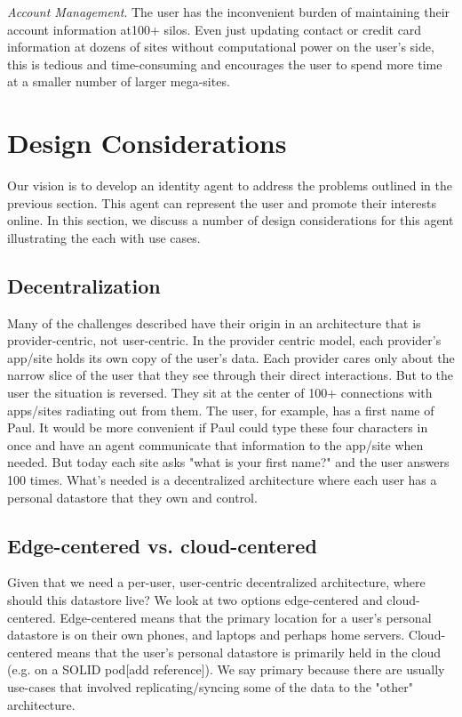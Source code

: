 \documentclass[11pt, oneside]{article}   	%
\begin{document}
\emph{Account Management}. The user has the inconvenient burden of maintaining their account information at100+ silos. Even just updating contact or credit card information at dozens of sites without computational power on the user's side, this is tedious and time-consuming and encourages the user to spend more time at a smaller number of larger mega-sites.

\section{Design Considerations}
Our vision is to develop an identity agent to address the problems outlined in the previous section. This agent  can represent the user and promote their interests online. In this section, we discuss a number of design considerations for this agent illustrating the each with use cases.

\subsection{Decentralization}

Many of the challenges described have their origin in an architecture that is provider-centric, not user-centric. In the provider centric model, each provider's app/site holds its own copy of the user's data. Each provider cares only about the narrow slice of the user that they see through their direct interactions. But to the user the situation is reversed. They sit at the center of 100+ connections with apps/sites radiating out from them. The user, for example, has a first name of Paul. It would be more convenient if Paul could type these four characters in once and have an agent communicate that information to the app/site when needed. But today each site asks "what is your first name?" and the user answers 100 times. What's needed is a decentralized architecture where each user has a personal datastore that they own and control. 

\subsection{Edge-centered vs. cloud-centered}
Given that we need a per-user, user-centric decentralized architecture, where should this datastore live? We look at two options edge-centered and cloud-centered. Edge-centered means that the primary location for a user's personal datastore is on their own phones, and laptops and perhaps home servers. Cloud-centered means that the user's personal datastore is primarily held in the cloud (e.g. on a SOLID pod[add reference]). We say primary because there are usually use-cases that involved replicating/syncing some of the data to the "other" architecture. 
\end{document}
